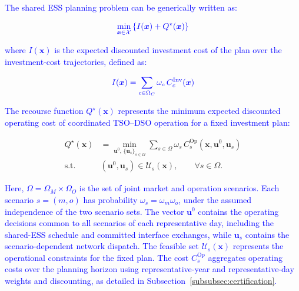 \documentclass[preprint,12pt]{elsarticle}
\begin{document}
\textcolor{blue}{The shared ESS planning problem can be generically written as:}

\begin{equation}
    \textcolor{blue}{
        \min_{\boldsymbol{x}\in\mathcal{X}}
        \left\{
            I(\boldsymbol{x}) + Q^\star(\boldsymbol{x})
        \right\}
    }
    \label{eq:two_stage_planning_problem}
\end{equation}

\noindent
\textcolor{blue}{where $I(\boldsymbol{x})$ is the expected discounted investment cost of the plan over the investment-cost trajectories, defined as:}

\begin{equation}
    \textcolor{blue}{
        I(\boldsymbol{x}) = \sum_{c\in\Omega_C} \omega_c\, C_c^{\text{Inv}}(\boldsymbol{x})
    }
    \label{eq:investment_cost_generic}
\end{equation}

\noindent
\textcolor{blue}{The recourse function $Q^\star(\boldsymbol{x})$ represents the minimum expected discounted operating cost of coordinated TSO--DSO operation for a fixed investment plan:}

\begin{subequations}
    \begin{align}
        Q^\star(\boldsymbol{x})
        &=
        \min_{\boldsymbol{u}^{0},\,\{\boldsymbol{u}_s\}_{s\in\Omega}}
        \sum_{s\in\Omega}
        \omega_s\,C_s^{\mathrm{Op}}
        \left(\boldsymbol{x},\boldsymbol{u}^{0},\boldsymbol{u}_s\right)
        \\
        \text{s.t.}\quad
        &(\boldsymbol{u}^{0},\boldsymbol{u}_s)
        \in\mathcal{U}_s(\boldsymbol{x}),
        \qquad \forall s\in\Omega .
    \end{align}
    \label{eq:operational_recourse_function}
\end{subequations}

\noindent
\textcolor{blue}{
   Here, 
   $\Omega=\Omega_M\times\Omega_O$ is the set of joint market and operation scenarios. Each scenario $s=(m,o)$ has probability $\omega_s=\omega_m\omega_o$, under the assumed independence of the two scenario sets. 
   The vector $\boldsymbol{u}^{0}$ contains the operating decisions common to all scenarios of each representative day, including the shared-ESS schedule and committed interface exchanges, while $\boldsymbol{u}_s$ contains the scenario-dependent network dispatch. 
   The feasible set $\mathcal{U}_s(\boldsymbol{x})$ represents the operational constraints for the fixed plan. The cost $C_s^{\mathrm{Op}}$ aggregates operating costs over the planning horizon using representative-year and representative-day weights and discounting, as detailed in Subsection~\ref{subsubsec:certification}.
}
\end{document}
